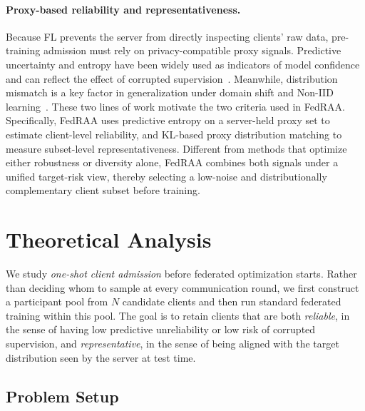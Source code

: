 \documentclass[conference]{IEEEtran}
\theoremstyle{definition}
\theoremstyle{remark}
\begin{document}
\paragraph{Proxy-based reliability and representativeness.}
Because FL prevents the server from directly inspecting clients' raw data, pre-training admission must rely on privacy-compatible proxy signals.
Predictive uncertainty and entropy have been widely used as indicators of model confidence and can reflect the effect of corrupted supervision~\cite{natarajan2013learning,tsouvalas2022labeling}.
Meanwhile, distribution mismatch is a key factor in generalization under domain shift and Non-IID learning~\cite{ben2010theory,hsu2019measuring,zhu2021survey}.
These two lines of work motivate the two criteria used in FedRAA.
Specifically, FedRAA uses predictive entropy on a server-held proxy set to estimate client-level reliability, and KL-based proxy distribution matching to measure subset-level representativeness.
Different from methods that optimize either robustness or diversity alone, FedRAA combines both signals under a unified target-risk view, thereby selecting a low-noise and distributionally complementary client subset before training.


\section{Theoretical Analysis}
\label{sec:theoretical_analysis}

We study \emph{one-shot client admission} before federated optimization starts.
Rather than deciding whom to sample at every communication round, we first construct a participant pool from $N$ candidate clients and then run standard federated training within this pool.
The goal is to retain clients that are both \emph{reliable}, in the sense of having low predictive unreliability or low risk of corrupted supervision, and \emph{representative}, in the sense of being aligned with the target distribution seen by the server at test time.

\subsection{Problem Setup}
\label{subsec:problem_setup}
\end{document}
